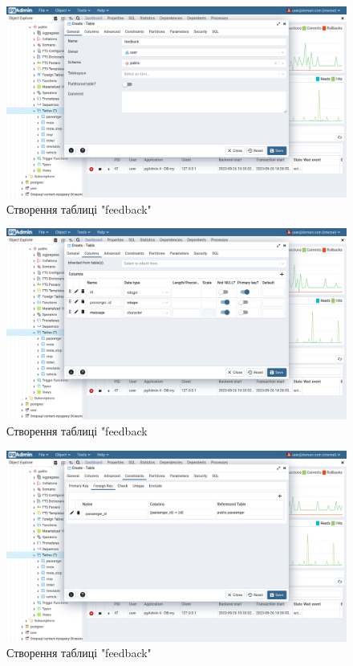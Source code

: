 \documentclass[14pt]{extreport}
\begin{document}
\begin{normalsize}
	\begin{figure}[H]
		\centering
		\includegraphics[scale=0.35]{38}
		\caption{Створення таблиці "feedback"}
	\end{figure}
	
	\begin{figure}[H]
		\centering
		\includegraphics[scale=0.35]{39}
		\caption{Створення таблиці "feedback}
	\end{figure}
	
	\begin{figure}[H]
		\centering
		\includegraphics[scale=0.35]{40}
		\caption{Створення таблиці "feedback"}
	\end{figure}
	

\end{normalsize}
\end{document}
